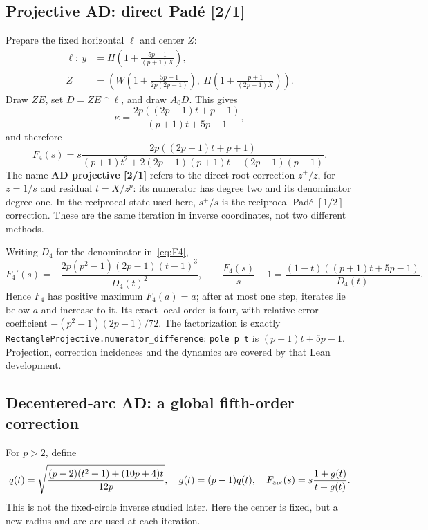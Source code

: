 \documentclass[11pt,a4paper]{article}
\theoremstyle{remark}\newtheorem{remark}[theorem]{Remark}
\begin{document}
\subsection{Projective AD: direct Pad\'e [2/1]}
Prepare the fixed horizontal $\ell$ and center $Z$:
\begin{align}
 \ell:\ y&=H\left(1+\frac{5p-1}{(p+1)X}\right),\label{eq:projectiveprep}\\
 Z&=\left(W\left(1+\frac{5p-1}{2p(2p-1)}\right),\ H\left(1+\frac{p+1}{(2p-1)X}\right)\right).\nonumber
\end{align}
Draw $ZE$, set $D=ZE\cap\ell$, and draw $A_0D$. This gives
\[
 \kappa=\frac{2p((2p-1)t+p+1)}{(p+1)t+5p-1},
\]
and therefore
\begin{equation}\label{eq:F4}
 F_4(s)=s\frac{2p((2p-1)t+p+1)}{(p+1)t^2+2(2p-1)(p+1)t+(2p-1)(p-1)}.
\end{equation}
The name \textbf{AD projective [2/1]} refers to the direct-root correction $z^+/z$, for $z=1/s$ and residual $t=X/z^p$: its numerator has degree two and its denominator degree one. In the reciprocal state used here, $s^+/s$ is the reciprocal Pad\'e $[1/2]$ correction. These are the same iteration in inverse coordinates, not two different methods.

Writing $D_4$ for the denominator in~\eqref{eq:F4},
\[
 F_4'(s)=-\frac{2p(p^2-1)(2p-1)(t-1)^3}{D_4(t)^2},\qquad
 \frac{F_4(s)}s-1=\frac{(1-t)((p+1)t+5p-1)}{D_4(t)}.
\]
Hence $F_4$ has positive maximum $F_4(a)=a$; after at most one step, iterates lie below $a$ and increase to it. Its exact local order is four, with relative-error coefficient $-(p^2-1)(2p-1)/72$. The factorization is exactly \texttt{RectangleProjective.numerator\_difference}: \texttt{pole p t} is $(p+1)t+5p-1$. Projection, correction incidences and the dynamics are covered by that Lean development.

\subsection{Decentered-arc AD: a global fifth-order correction}\label{sec:arc}
For $p>2$, define
\begin{equation}\label{eq:arcmap}
 q(t)=\sqrt{\frac{(p-2)(t^2+1)+(10p+4)t}{12p}},\quad
 g(t)=(p-1)q(t),\quad F_{\rm arc}(s)=s\frac{1+g(t)}{t+g(t)}.
\end{equation}
This is not the fixed-circle inverse studied later. Here the center is fixed, but a new radius and arc are used at each iteration.
\end{document}
